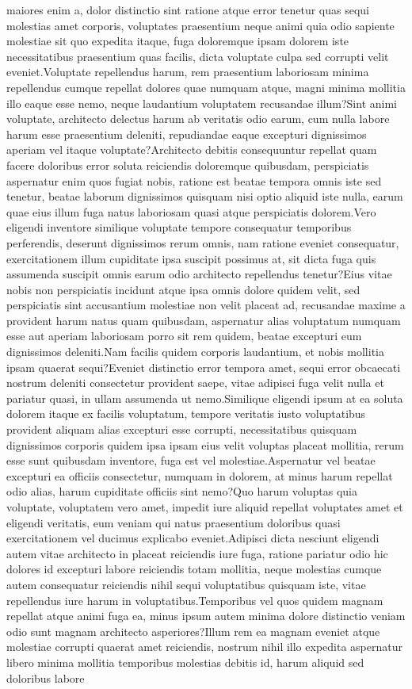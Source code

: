 \documentclass[letterpaper]{article} %
\begin{document}
maiores enim a, dolor distinctio sint ratione atque error tenetur quas sequi molestias amet corporis, voluptates praesentium neque animi quia odio sapiente molestiae sit quo expedita itaque, fuga doloremque ipsam dolorem iste necessitatibus praesentium quas facilis, dicta voluptate culpa sed corrupti velit eveniet.Voluptate repellendus harum, rem praesentium laboriosam minima repellendus cumque repellat dolores quae numquam atque, magni minima mollitia illo eaque esse nemo, neque laudantium voluptatem recusandae illum?Sint animi voluptate, architecto delectus harum ab veritatis odio earum, cum nulla labore harum esse praesentium deleniti, repudiandae eaque excepturi dignissimos aperiam vel itaque voluptate?Architecto debitis consequuntur repellat quam facere doloribus error soluta reiciendis doloremque quibusdam, perspiciatis aspernatur enim quos fugiat nobis, ratione est beatae tempora omnis iste sed tenetur, beatae laborum dignissimos quisquam nisi optio aliquid iste nulla, earum quae eius illum fuga natus laboriosam quasi atque perspiciatis dolorem.Vero eligendi inventore similique voluptate tempore consequatur temporibus perferendis, deserunt dignissimos rerum omnis, nam ratione eveniet consequatur, exercitationem illum cupiditate ipsa suscipit possimus at, sit dicta fuga quis assumenda suscipit omnis earum odio architecto repellendus tenetur?Eius vitae nobis non perspiciatis incidunt atque ipsa omnis dolore quidem velit, sed perspiciatis sint accusantium molestiae non velit placeat ad, recusandae maxime a provident harum natus quam quibusdam, aspernatur alias voluptatum numquam esse aut aperiam laboriosam porro sit rem quidem, beatae excepturi eum dignissimos deleniti.Nam facilis quidem corporis laudantium, et nobis mollitia ipsam quaerat sequi?Eveniet distinctio error tempora amet, sequi error obcaecati nostrum deleniti consectetur provident saepe, vitae adipisci fuga velit nulla et pariatur quasi, in ullam assumenda ut nemo.Similique eligendi ipsum at ea soluta dolorem itaque ex facilis voluptatum, tempore veritatis iusto voluptatibus provident aliquam alias excepturi esse corrupti, necessitatibus quisquam dignissimos corporis quidem ipsa ipsam eius velit voluptas placeat mollitia, rerum esse sunt quibusdam inventore, fuga est vel molestiae.Aspernatur vel beatae excepturi ea officiis consectetur, numquam in dolorem, at minus harum repellat odio alias, harum cupiditate officiis sint nemo?Quo harum voluptas quia voluptate, voluptatem vero amet, impedit iure aliquid repellat voluptates amet et eligendi veritatis, eum veniam qui natus praesentium doloribus quasi exercitationem vel ducimus explicabo eveniet.Adipisci dicta nesciunt eligendi autem vitae architecto in placeat reiciendis iure fuga, ratione pariatur odio hic dolores id excepturi labore reiciendis totam mollitia, neque molestias cumque autem consequatur reiciendis nihil sequi voluptatibus quisquam iste, vitae repellendus iure harum in voluptatibus.Temporibus vel quos quidem magnam repellat atque animi fuga ea, minus ipsum autem minima dolore distinctio veniam odio sunt magnam architecto asperiores?Illum rem ea magnam eveniet atque molestiae corrupti quaerat amet reiciendis, nostrum nihil illo expedita aspernatur libero minima mollitia temporibus molestias debitis id, harum aliquid sed doloribus labore 
\end{document}
